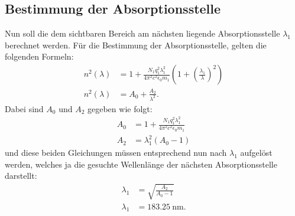 \subsection{Bestimmung der Absorptionsstelle}
Nun soll die dem sichtbaren Bereich am nächsten liegende Absorptionsstelle $\lambda_1$ berechnet werden. 
Für die Bestimmung der Absorptionsstelle, gelten die folgenden Formeln:
\begin{align}
n^2(\lambda) &= 1+ \frac{N_1 q^2_1 \lambda^2_1}{4 \pi^2 c^2 \epsilon_0 m_1} \left(1+ \left(\frac{\lambda_1}{\lambda}\right)^2 \right) \\
n^2(\lambda) &= A_0 + \frac{A_2}{\lambda^2}.
\end{align}
Dabei sind $A_0$ und $A_2$ gegeben wie folgt:
\begin{align}
A_0 &= 1 + \frac{N_1 q^2_1 \lambda^2_1}{4 \pi^2 c^2 \epsilon_0 m_1} \\
A_2 &= \lambda^2_1(A_0 - 1)
\end{align}
und diese beiden Gleichungen müssen entsprechend nun nach $\lambda_1$ aufgelöst werden, welches ja die gesuchte Wellenlänge der nächsten Absorptionsstelle darstellt:
\begin{align*}
\lambda_1 &= \sqrt{\frac{A_2}{A_0-1}} \\
\lambda_1 &= \SI{183,25}{\nano\meter}.
\end{align*}